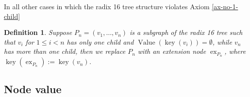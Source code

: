 \documentclass{article}
\newcommand{\assign}{:=}
\newcommand{\tmop}[1]{\ensuremath{\operatorname{#1}}}
\newtheorem{definition}{Definition}
\begin{document}
In all other cases in which the radix 16 tree structure violates Axiom
\ref{ax-no-1-child}

\begin{definition}
  Suppose $P_n = (v_1, \ldots, v_n)$ is a subgraph of the radix 16 tree such
  that $v_i$ for $1 \leqslant i < n$ has only one child and $\tmop{Value}
  (\tmop{key} (v_i)) = \emptyset$, while $v_n$ has more than one child, then
  we replace $P_n$ with an extension node $\tmop{ex}_{P_n}$, where $\tmop{key}
  (\tmop{ex}_{P_n}) \assign \tmop{key} (v_n)$. 
\end{definition}

\subsection{Node value}

\
\end{document}
